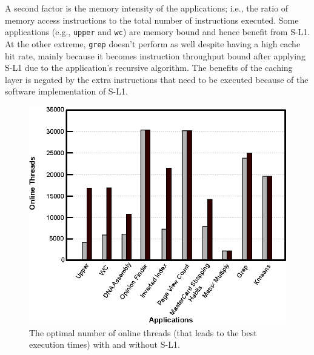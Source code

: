 A second factor is the memory intensity of the applications; i.e., the ratio of memory access instructions to the total number of instructions executed.
Some applications (e.g., \texttt{upper} and \texttt{wc}) are memory bound and hence benefit from S-L1.
At the other extreme, \texttt{grep} doesn't perform as well despite having a
high cache hit rate, mainly because it becomes instruction throughput bound
after applying S-L1 due to the application's recursive algorithm. The benefits of the
caching layer is negated by the extra instructions that need to be executed
because of the software implementation of S-L1.



\begin{figure}[t]
\center
\includegraphics[scale=0.75]{8higherParallelism.eps}
\vspace{-0.0cm}
\caption{\footnotesize\textnormal{The optimal number of online threads (that leads to the best execution times) with and without S-L1.}}
\label{fig:levelprallelism}
\end{figure}



